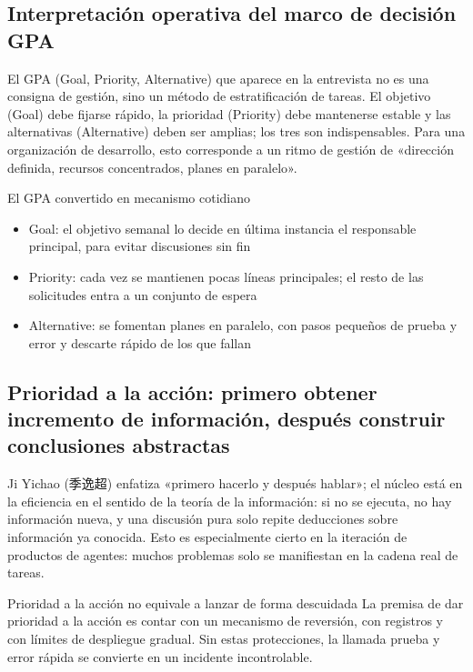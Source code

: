 \documentclass[a4paper]{article}
\begin{document}
\subsection{Interpretación operativa del marco de decisión GPA}

El GPA (Goal, Priority, Alternative) que aparece en la entrevista no es una consigna de gestión, sino un método de estratificación de tareas. El objetivo (Goal) debe fijarse rápido, la prioridad (Priority) debe mantenerse estable y las alternativas (Alternative) deben ser amplias; los tres son indispensables. Para una organización de desarrollo, esto corresponde a un ritmo de gestión de «dirección definida, recursos concentrados, planes en paralelo».

\begin{importantbox}{El GPA convertido en mecanismo cotidiano}
\begin{itemize}
    \item Goal: el objetivo semanal lo decide en última instancia el responsable principal, para evitar discusiones sin fin
    \item Priority: cada vez se mantienen pocas líneas principales; el resto de las solicitudes entra a un conjunto de espera
    \item Alternative: se fomentan planes en paralelo, con pasos pequeños de prueba y error y descarte rápido de los que fallan
\end{itemize}
\end{importantbox}

\subsection{Prioridad a la acción: primero obtener incremento de información, después construir conclusiones abstractas}

Ji Yichao (季逸超) enfatiza «primero hacerlo y después hablar»; el núcleo está en la eficiencia en el sentido de la teoría de la información: si no se ejecuta, no hay información nueva, y una discusión pura solo repite deducciones sobre información ya conocida. Esto es especialmente cierto en la iteración de productos de agentes: muchos problemas solo se manifiestan en la cadena real de tareas.

\begin{warningbox}{Prioridad a la acción no equivale a lanzar de forma descuidada}
La premisa de dar prioridad a la acción es contar con un mecanismo de reversión, con registros y con límites de despliegue gradual. Sin estas protecciones, la llamada prueba y error rápida se convierte en un incidente incontrolable.
\end{warningbox}
\end{document}

